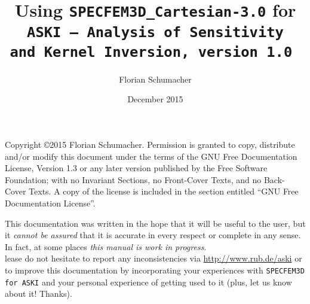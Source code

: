 \documentclass[12pt,a4paper]{article}
\newcommand{\lcode}[1]{\nolinkurl{#1}}
\begin{document}
%
\setlength{\parindent}{0cm}
\addtolength{\parskip}{0.5em}
%
%
%
\title{Using {\tt \Huge SPECFEM3D\_Cartesian-3.0} for \\ \tt {\Huge ASKI} {\rm--} {\Huge A}{\large nalysis of} {\Huge S}{\large ensitivity \\ and} {\Huge\tt K}{\large ernel} {\Huge\tt I}{\large nversion, version 1.0} }
\author[1]{Florian Schumacher}
\date{December 2015}
\maketitle
%
Copyright \copyright 2015 Florian Schumacher.
Permission is granted to copy, distribute and/or modify this document
under the terms of the GNU Free Documentation License, Version 1.3
or any later version published by the Free Software Foundation;
with no Invariant Sections, no Front-Cover Texts, and no Back-Cover Texts.
A copy of the license is included in the section entitled ``GNU
Free Documentation License''.

\vspace{1cm}

This documentation was written in the hope that it will be useful to the user,
but it \emph{cannot be assured} that it is accurate in every respect or complete in any sense.
In fact, at some places \emph{this manual is work in progress}.\\
lease do not hesitate to report any inconsistencies via \url{http://www.rub.de/aski} or
to improve this documentation by incorporating your experiences with \lcode{SPECFEM3D for ASKI} 
and your personal experience of getting used to it (plus, let us know about it! Thanks). 
\end{document}
